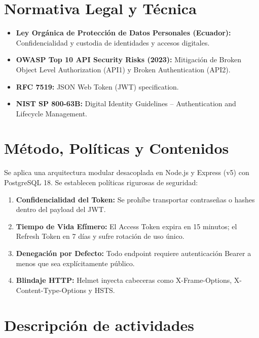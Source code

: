 \documentclass[12pt,a4paper]{article}
\begin{document}
\section{Normativa Legal y Técnica}
\begin{itemize}[leftmargin=1.5em, itemsep=2pt, topsep=2pt]
    \item \textbf{Ley Orgánica de Protección de Datos Personales (Ecuador):} Confidencialidad y custodia de identidades y accesos digitales.
    \item \textbf{OWASP Top 10 API Security Risks (2023):} Mitigación de Broken Object Level Authorization (API1) y Broken Authentication (API2).
    \item \textbf{RFC 7519:} JSON Web Token (JWT) specification.
    \item \textbf{NIST SP 800-63B:} Digital Identity Guidelines -- Authentication and Lifecycle Management.
\end{itemize}

\section{Método, Políticas y Contenidos}
Se aplica una arquitectura modular desacoplada en Node.js y Express (v5) con PostgreSQL 18. Se establecen políticas rigurosas de seguridad:
\begin{enumerate}[leftmargin=1.5em, itemsep=1.5pt]
    \item \textbf{Confidencialidad del Token:} Se prohíbe transportar contraseñas o hashes dentro del payload del JWT.
    \item \textbf{Tiempo de Vida Efímero:} El Access Token expira en 15 minutos; el Refresh Token en 7 días y sufre rotación de uso único.
    \item \textbf{Denegación por Defecto:} Todo endpoint requiere autenticación Bearer a menos que sea explícitamente público.
    \item \textbf{Blindaje HTTP:} Helmet inyecta cabeceras como X-Frame-Options, X-Content-Type-Options y HSTS.
\end{enumerate}

\section{Descripción de actividades}
\end{document}
